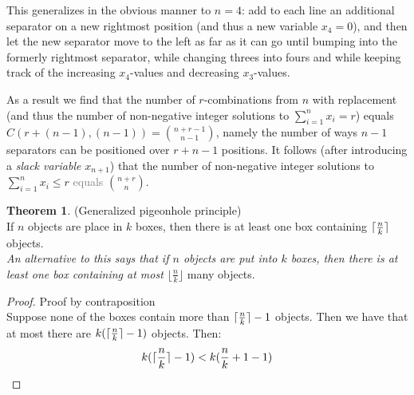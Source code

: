 \documentclass[titlepage]{article}
\DeclarePairedDelimiter{\ceil}{\lceil}{\rceil}
\theoremstyle{definition}
\newcommand{\floor}[1]{\lfloor #1 \rfloor}
\newtheorem{theorem}{Theorem}[section]
\numberwithin{equation}{subsection}
\numberwithin{remark}{subsection}
\begin{document}
This generalizes in the obvious manner to $n=4$: add to each line an additional separator on a new rightmost position (and thus a new variable $x_4=0$), and then let the new separator move to the left as far as it can go until bumping into the formerly rightmost separator, while changing threes into fours and while keeping track of the increasing $x_4$-values and decreasing $x_3$-values.

As a result we find that the number of $r$-combinations from $n$ with replacement (and thus the number of non-negative integer solutions to $\sum_{i=1}^nx_i= r$) equals $C(r+(n-1),(n-1))={n+r-1\choose n-1}$, namely the number of ways $n-1$ separators can be positioned over $r+n-1$ positions. It follows (after introducing a \emph{slack variable} $x_{n+1}$) that the number of non-negative integer solutions to $\sum_{i=1}^nx_i\le r$ \textcolor{gray}{equals} $n+r\choose n$.\\
\par\noindent

\begin{theorem}(Generalized pigeonhole principle)
\\ 

If $n$ objects are place in $k$ boxes, then there is at least one box containing $\ceil{\frac{n}{k}}$ objects. 
\\

\textit{An alternative to this says that if $n$ objects are put into $k$ boxes, then there is at least one box containing at most $\floor{\frac{n}{k}}$} many objects. 
\end{theorem}

\begin{proof} Proof by contraposition
\\

Suppose none of the boxes contain more than $\ceil{\frac{n}{k}} - 1$ objects. Then we have that at most there are $k(\ceil{\frac{n}{k}} - 1)$ objects. Then:
$$k(\ceil{\frac{n}{k}} - 1) < k(\frac{n}{k} + 1 - 1)$$
\end{proof}
\end{document}
